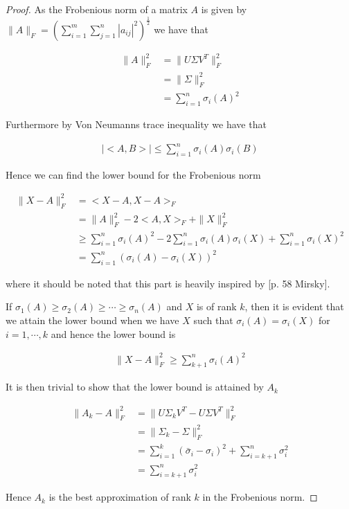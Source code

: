 \documentclass[11pt,a4paper,english]{elsarticle}%
\begin{document}
\begin{proof}
  As the Frobenious norm of a matrix $A$ is given by $\|A\|_F = (\sum_{i=1}^m \sum_{j=1}^n |a_{ij}|^2)^{\frac{1}{2}}$ we have that

  \begin{align}
    \|A\|_F^2 &= \|U\Sigma V^T\|_F^2 \\
    &=\|\Sigma \|_F^2 \\
    &= \sum_{i=1}^n \sigma_i(A)^2
  \end{align}

  Furthermore by Von Neumanns trace inequality we have that

  \begin{align}
    |<A,B>| \leq \sum_{i=1}^n \sigma_i(A)\sigma_i(B)
  \end{align}

  Hence we can find the lower bound for the Frobenious norm

  \begin{align}
    \|X-A\|_F^2 &= <X-A,X-A>_F \\
    &= \|A\|_F^2 - 2<A,X>_F + \|X\|^2_F\\
    &\geq \sum_{i=1}^n \sigma_i(A)^2 -2\sum_{i=1}^n\sigma_i(A)\sigma_i(X) + \sum_{i=1}^n \sigma_i(X)^2 \\
    &= \sum_{i=1}^n(\sigma_i(A) - \sigma_i(X))^2
  \end{align}

  \noindent where it should be noted that this part is heavily inspired by [p. 58 Mirsky]\cite{Mirsky}.

  If $\sigma_1(A) \geq \sigma_2(A) \geq \cdots \geq \sigma_n(A)$ and $X$ is of rank $k$, then it is evident that we attain the lower bound when we have $X$ such that $\sigma_i(A) = \sigma_i(X)$ for $i = 1,\cdots,k$ and hence the lower bound is

  \begin{align}
    \|X-A\|^2_F \geq \sum_{k+1}^n \sigma_i(A)^2
  \end{align}

  It is then trivial to show that the lower bound is attained by $A_k$

  \begin{align*}
    \|A_k - A\|_F^2 &= \|U\Sigma_kV^T - U\Sigma V^T\|_F^2 \\
    &= \|\Sigma_k - \Sigma \|_F^2 \\
    &= \sum_{i = 1}^k (\bar \sigma_i - \sigma_i)^2 + \sum_{i = k+1}^n \sigma_i^2 \\
    &= \sum_{i = k+1}^n \sigma_i^2
  \end{align*}

  Hence $A_k$ is the best approximation of rank $k$ in the Frobenious norm.
\end{proof}
\end{document}
